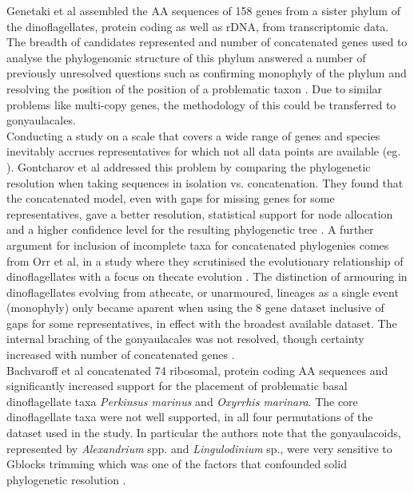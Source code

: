 \documentclass[12pt]{article}
\begin{document}
Genetaki et al assembled the AA sequences of 158 genes from a sister phylum of the dinoflagellates, protein coding as well as rDNA, from transcriptomic data. The breadth of candidates represented and number of concatenated genes used to analyse the phylogenomic structure of this phylum answered a number of previously unresolved questions such as confirming monophyly of the phylum and resolving the position of the position of a problematic taxon \cite{gentekaki2014large}. Due to similar problems like multi-copy genes, the methodology of this could be transferred to gonyaulacales. \\
Conducting a study on a scale that covers a wide range of genes and species inevitably accrues representatives for which not all data points are available (eg. \cite{gentekaki2014large,bachvaroff2014dinoflagellate}). Gontcharov et al addressed this problem by comparing the phylogenetic resolution when taking sequences in isolation vs. concatenation. They found that the concatenated model, even with gaps for missing genes for some representatives, gave a better resolution, statistical support for node allocation and a higher confidence level for the resulting phylogenetic tree \cite{gontcharov2004combined}. A further argument for inclusion of incomplete taxa for concatenated phylogenies comes from Orr et al, in a study where they scrutinised the evolutionary relationship of dinoflagellates with a focus on thecate evolution \cite{orr2012naked}. The distinction of armouring in dinoflagellates evolving from athecate, or unarmoured, lineages as a single event (monophyly) only became aparent when using the 8 gene dataset inclusive of gaps for some representatives, in effect with the broadest available dataset. The internal braching of the gonyaulacales was not resolved, though certainty increased with number of concatenated genes \cite{orr2012naked}. \\ Bachvaroff et al concatenated 74 ribosomal, protein coding AA sequences and significantly increased support for the placement of problematic basal dinoflagellate taxa \textit{Perkinsus marinus } and \textit{Oxyrrhis marinara}. The core dinoflagellate taxa were not well supported, in all four permutations of the dataset used in the study. In particular the authors note that the gonyaulacoids, represented by \textit{Alexandrium} spp. and \textit{Lingulodinium} sp., were very sensitive to Gblocks trimming which was one of the factors that confounded solid phylogenetic resolution \cite{bachvaroff2014dinoflagellate}.\\
\end{document}
